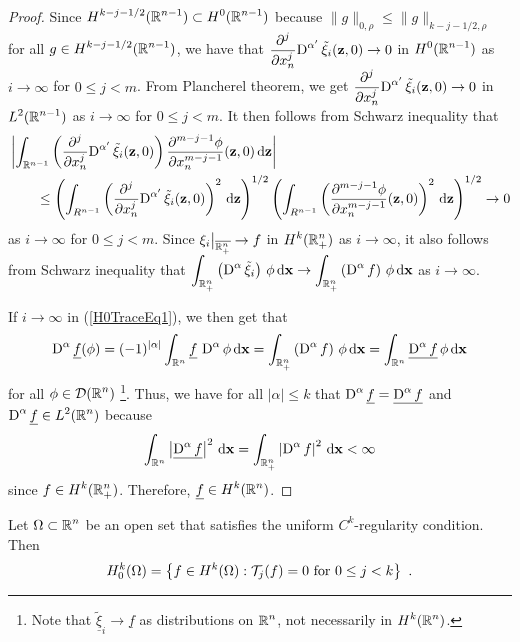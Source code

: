 \begin{proof}
Since $\displaystyle H^{k-j -1/2}(\RR^{n-1}) \subset H^0(\RR^{n-1})$
because $\|g\|_{0,\rho} \leq \|g\|_{k-j -1/2,\rho}$ for all
$\displaystyle g \in H^{k-j -1/2}(\RR^{n-1})$, we have that
$\displaystyle \pdfdxn{\diff^{\alpha'} \tilde{\xi}_i}{x_n}{j}(\VEC{z},0) \to 0$
in $\displaystyle H^0(\RR^{n-1})$ as $i \to \infty$ for $0 \leq j <m$.
From Plancherel theorem, we get
$\displaystyle \pdfdxn{\diff^{\alpha'} \tilde{\xi}_i}{x_n}{j}(\VEC{z},0) \to 0$
in $\displaystyle L^2(\RR^{n-1})$ as $i \to \infty$ for $0 \leq j <m$.
It then follows from Schwarz inequality that
\begin{align*}
&\left| \int_{\RR^{n-1}}
\left( \pdfdxn{\diff^{\alpha'} \tilde{\xi}_i}{x_n}{j}(\VEC{z},0) \right)
\pdydxn{\phi}{x_n}{m-j-1}(\VEC{z},0) 
\dx{\VEC{z}} \right| \\
& \qquad \leq
\left( \int_{R^{n-1}} \left(
\pdfdxn{\diff^{\alpha'} \tilde{\xi}_i}{x_n}{j}(\VEC{z},0) \right)^2
\dx{\VEC{z}} \right)^{1/2}
\left( \int_{R^{n-1}} \left( \pdydxn{\phi}{x_n}{m-j-1}(\VEC{z},0) \right)^2
\dx{\VEC{z}} \right)^{1/2} \to 0
\end{align*}
as $i \to \infty$ for $0 \leq j <m$.
Since $\displaystyle \xi_i\big|_{\overline{\RR^n_+}} \to f$ in
$\displaystyle H^k(\RR^n_+)$ as $i \to \infty$, it also follows from Schwarz
inequality that
$\displaystyle \int_{\RR^n_+} \left(\diff^\alpha
\tilde{\xi}_i\right)\, \phi \dx{\VEC{x}}
\to \int_{\RR^n_+} \left(\diff^\alpha f\right) \, \phi \dx{\VEC{x}}$
as $i \to \infty$.

If $i \to \infty$ in (\ref{H0TraceEq1}), we then
get that
\[
\diff^\alpha \underline{f} (\phi)
= (-1)^{|\alpha|} \int_{\RR^n}
\underline{f}\, \diff^\alpha \phi \dx{\VEC{x}}
= \int_{\RR^n_+} \left(\diff^\alpha f \right)\, \phi \dx{\VEC{x}}
= \int_{\RR^n} \underline{\diff^\alpha f}\, \phi \dx{\VEC{x}}
\]
for all $\displaystyle \phi \in \DD(\RR^n)$ \footnote{Note that
$\underline{\tilde{\xi}}_i \to \underline{f}$ as distributions on
$\displaystyle \RR^n$, not necessarily in $\displaystyle H^k(\RR^n)$.}.
Thus, we have for all $|\alpha| \leq k$
that $\displaystyle \diff^\alpha \underline{f} = \underline{\diff^\alpha f}$
and $\displaystyle \diff^\alpha \underline{f} \in L^2(\RR^n)$ because
\[
\int_{\RR^n} \left|\underline{\diff^\alpha f}\right|^2 \dx{\VEC{x}}
= \int_{\RR^n_+} \left|\diff^\alpha f\right|^2 \dx{\VEC{x}} < \infty
\]
since $\displaystyle f \in H^k(\RR^n_+)$.
Therefore, $\displaystyle \underline{f} \in H^k(\RR^n)$.
\end{proof}

\begin{theorem} \label{H0TraceOmega}
Let $\displaystyle \Omega \subset \RR^n$ be an open set that satisfies
the uniform $\displaystyle C^k$-regularity condition.  Then
\[
H^{k}_0(\Omega) = \left\{ f \in H^{k}(\Omega) : \TT_j(f) = 0
\ \text{for} \ 0 \leq j < k \right\} \ .
\]
\end{theorem}

